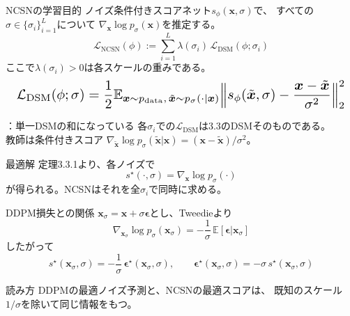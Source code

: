\asmain
\begin{frame}{NCSNの学習目的}
    ノイズ条件付きスコアネット$s_\phi(\bm{x},\sigma)$で、
    すべての$\sigma\in\{\sigma_i\}_{i=1}^{L}$について
    $\nabla_{\bm{x}}\log p_{\sigma}(\bm{x})$を推定する。
    \[
        \mathcal{L}_{\mathrm{NCSN}}(\phi)
        :=
        \sum_{i=1}^{L}
        \lambda(\sigma_i)\,
        \mathcal{L}_{\mathrm{DSM}}(\phi;\sigma_i)
        \tag{3.4.1}
    \]
    ここで$\lambda(\sigma_i)>0$は各スケールの重みである。
    \[
        \resizebox{0.98\textwidth}{!}{$
        \mathcal{L}_{\mathrm{DSM}}(\phi;\sigma)
        =
        \dfrac12
        \mathbb{E}_{\bm{x}\sim p_{\mathrm{data}},\,
        \tilde{\bm{x}}\sim p_{\sigma}(\cdot|\bm{x})}
        \Bigl\|
        s_\phi(\tilde{\bm{x}},\sigma)
        -
        \dfrac{\bm{x}-\tilde{\bm{x}}}{\sigma^{2}}
        \Bigr\|_{2}^{2}
        $}
    \]
\end{frame}
\assuppl
\begin{frame}{\supplmark：単一DSMの和になっている}
    各$\sigma_i$での$\mathcal{L}_{\mathrm{DSM}}$は3.3のDSMそのものである。\\
    教師は条件付きスコア
    $\nabla_{\tilde{\bm{x}}}\log p_{\sigma}(\tilde{\bm{x}}|\bm{x})=(\bm{x}-\tilde{\bm{x}})/\sigma^{2}$。
    \begin{exampleblock}{最適解}
        定理3.3.1より、各ノイズで
        \[
            s^{\star}(\cdot,\sigma)
            =
            \nabla_{\bm{x}}\log p_{\sigma}(\cdot)
        \]
        が得られる。NCSNはそれを全$\sigma_i$で同時に求める。
    \end{exampleblock}
\end{frame}
\asmain
\begin{frame}{DDPM損失との関係}
    $\bm{x}_{\sigma}=\bm{x}+\sigma\bm{\epsilon}$とし、Tweedieより
    \[
        \nabla_{\bm{x}_{\sigma}}\log p_{\sigma}(\bm{x}_{\sigma})
        =
        -\frac{1}{\sigma}\,\mathbb{E}[\bm{\epsilon}|\bm{x}_{\sigma}]
    \]
    したがって
    \[
        s^{\star}(\bm{x}_{\sigma},\sigma)
        =
        -\frac{1}{\sigma}\,\bm{\epsilon}^{\star}(\bm{x}_{\sigma},\sigma),
        \qquad
        \bm{\epsilon}^{\star}(\bm{x}_{\sigma},\sigma)
        =
        -\sigma\,s^{\star}(\bm{x}_{\sigma},\sigma)
    \]
    \begin{block}{読み方}
        DDPMの最適ノイズ予測と、NCSNの最適スコアは、
        既知のスケール$1/\sigma$を除いて同じ情報をもつ。
    \end{block}
\end{frame}
